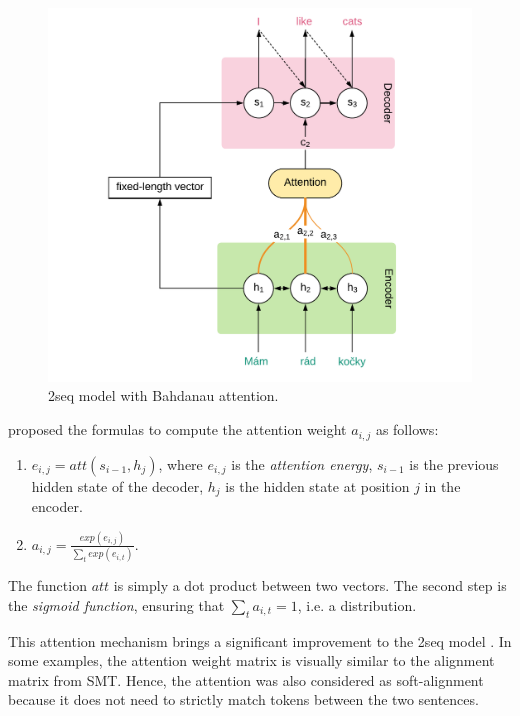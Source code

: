 \begin{figure}[t]
    \includegraphics[width=\linewidth]{img/seq2seq-att.pdf}
    \caption{\seq2seq model with Bahdanau attention.}
    \label{fig:seq2seq-att}
\end{figure}


\cite{bahdanau:etal:attention:iclr:2015} proposed the formulas to compute the attention weight $a_{i,j}$ as follows:
\begin{enumerate}
    \item $e_{i,j}=att(s_{i-1}, h_j)$, where $e_{i,j}$ is the \textit{attention energy}, $s_{i-1}$ is the previous hidden state of the decoder, $h_j$ is the hidden state at position $j$ in the encoder.
    \item $a_{i,j}=\frac{exp(e_{i,j})}{\sum_{t}exp(e_{i,t})}$.
\end{enumerate}

The function $att$ is simply a dot product between two vectors. The second step is the \textit{sigmoid function}, ensuring that $\sum_{t}a_{i,t} = 1$, i.e. a distribution. 

This attention mechanism brings a significant improvement to the \seq2seq model \citep{bahdanau:etal:attention:iclr:2015}.
In some examples, the attention weight matrix is visually similar to the alignment matrix from SMT.
Hence, the attention was also considered as soft-alignment because it does not need to strictly match tokens between the two sentences.

